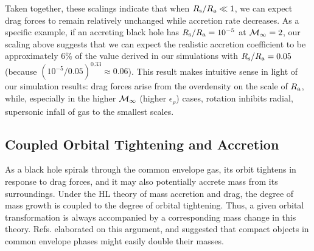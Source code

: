 Taken together, these scalings indicate that when $R_{\rm s}/R_{\rm a} \ll 1$, we can expect drag forces to remain relatively unchanged while accretion rate decreases. As a specific example, if an accreting black hole has $R_{\rm s}/R_{\rm a}=10^{-5}$ at ${\cal M}_\infty=2$, our scaling above suggests that we can expect the realistic accretion coefficient to be approximately 6\% of the value derived in our simulations with $R_{\rm s}/R_{\rm a}=0.05$ (because $(10^{-5}/0.05)^{0.33}\approx 0.06$).  This result makes intuitive sense in light of our simulation results: drag forces arise from the overdensity on the scale of $R_{\rm a}$, while, especially in the higher ${\cal M}_{\infty}$ (higher $\epsilon_\rho$) cases, rotation inhibits radial, supersonic infall of gas to the smallest scales.  

\vspace*{2.5mm}
\subsection{Coupled Orbital Tightening and Accretion}\label{sec:coupled}
As a black hole spirals through the common envelope gas, its orbit tightens in response to drag forces, and it may also potentially accrete mass from its surroundings. Under the HL theory of mass accretion and drag, the degree of mass growth is coupled to the degree of orbital tightening. Thus, a given orbital transformation is always accompanied by a corresponding mass change in this theory. Refs. \cite{Chevalier:1993,Brown:1995,Bethe:1998} elaborated on this argument, and suggested that compact objects in common envelope phases might easily double their masses. 

